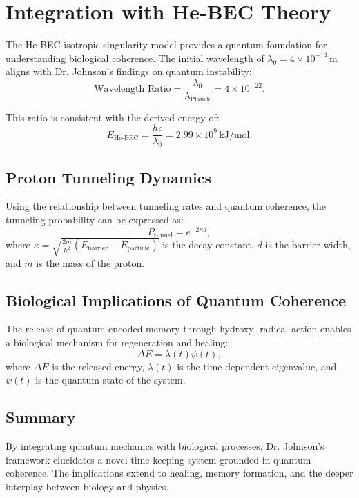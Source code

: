 \documentclass{article}
\theoremstyle{plain}
\begin{document}
\section{Integration with He-BEC Theory}
The He-BEC isotropic singularity model provides a quantum foundation for understanding biological coherence. The initial wavelength of \( \lambda_0 = 4 \times 10^{-14} \, \text{m} \) aligns with Dr. Johnson's findings on quantum instability:
\begin{equation}
\text{Wavelength Ratio} = \frac{\lambda_0}{\lambda_{\text{Planck}}} = 4 \times 10^{-22}.
\end{equation}

This ratio is consistent with the derived energy of:
\begin{equation}
E_{\text{He-BEC}} = \frac{hc}{\lambda_0} = 2.99 \times 10^{9} \, \text{kJ/mol}.
\end{equation}

\subsection{Proton Tunneling Dynamics}
Using the relationship between tunneling rates and quantum coherence, the tunneling probability can be expressed as:
\begin{equation}
P_{\text{tunnel}} = e^{-2 \kappa d},
\end{equation}
where \( \kappa = \sqrt{\frac{2m}{\hbar^2} (E_{\text{barrier}} - E_{\text{particle}})} \) is the decay constant, \( d \) is the barrier width, and \( m \) is the mass of the proton.

\subsection{Biological Implications of Quantum Coherence}
The release of quantum-encoded memory through hydroxyl radical action enables a biological mechanism for regeneration and healing:
\begin{equation}
\Delta E = \lambda(t) \psi(t),
\end{equation}
where \( \Delta E \) is the released energy, \( \lambda(t) \) is the time-dependent eigenvalue, and \( \psi(t) \) is the quantum state of the system.

\subsection{Summary}
By integrating quantum mechanics with biological processes, Dr. Johnson's framework elucidates a novel time-keeping system grounded in quantum coherence. The implications extend to healing, memory formation, and the deeper interplay between biology and physics.
\end{document}
